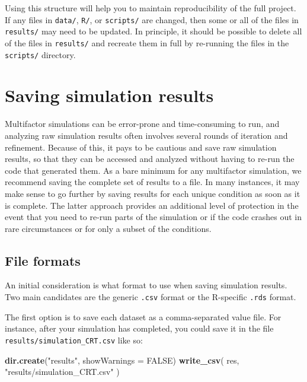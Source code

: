 \documentclass[
]{book}
\newenvironment{Shaded}{\begin{snugshade}}{\end{snugshade}}
\newcommand{\AttributeTok}[1]{\textcolor[rgb]{0.13,0.29,0.53}{#1}}
\newcommand{\ConstantTok}[1]{\textcolor[rgb]{0.56,0.35,0.01}{#1}}
\newcommand{\FunctionTok}[1]{\textcolor[rgb]{0.13,0.29,0.53}{\textbf{#1}}}
\newcommand{\NormalTok}[1]{#1}
\newcommand{\StringTok}[1]{\textcolor[rgb]{0.31,0.60,0.02}{#1}}
\begin{document}
Using this structure will help you to maintain reproducibility of the full project.
If any files in \texttt{data/}, \texttt{R/}, or \texttt{scripts/} are changed, then some or all of the files in \texttt{results/} may need to be updated.
In principle, it should be possible to delete all of the files in \texttt{results/} and recreate them in full by re-running the files in the \texttt{scripts/} directory.

\section{Saving simulation results}\label{saving-files}

Multifactor simulations can be error-prone and time-consuming to run, and analyzing raw simulation results often involves several rounds of iteration and refinement.
Because of this, it pays to be cautious and save raw simulation results, so that they can be accessed and analyzed without having to re-run the code that generated them.
As a bare minimum for any multifactor simulation, we recommend saving the complete set of results to a file.
In many instances, it may make sense to go further by saving results for each unique condition as soon as it is complete.
The latter approach provides an additional level of protection in the event that you need to re-run parts of the simulation or if the code crashes out in rare circumstances or for only a subset of the conditions.

\subsection{File formats}\label{file-formats}

An initial consideration is what format to use when saving simulation results.
Two main candidates are the generic \texttt{.csv} format or the R-specific \texttt{.rds} format.

The first option is to save each dataset as a comma-separated value file.
For instance, after your simulation has completed, you could save it in the file \texttt{results/simulation\_CRT.csv} like so:

\begin{Shaded}
\begin{Highlighting}[]
\FunctionTok{dir.create}\NormalTok{(}\StringTok{"results"}\NormalTok{, }\AttributeTok{showWarnings =} \ConstantTok{FALSE}\NormalTok{)}
\FunctionTok{write\_csv}\NormalTok{( res, }\StringTok{"results/simulation\_CRT.csv"}\NormalTok{ )}
\end{Highlighting}
\end{Shaded}
\end{document}
